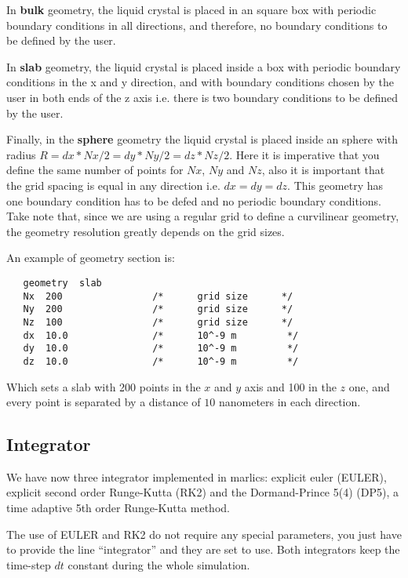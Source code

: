 \documentclass{article}
\begin{document}
In \textbf{bulk} geometry, the liquid crystal is placed in an square box
with periodic boundary conditions in all directions, and therefore, no boundary conditions to be defined by the user.

In \textbf{slab} geometry, the liquid crystal is placed inside a box
with periodic boundary conditions in the x and y direction, and with
boundary conditions chosen by the user in both ends of the z
axis i.e. there is two boundary conditions to be defined by the user. 

Finally, in the \textbf{sphere} geometry the liquid crystal is placed
inside an sphere with radius $R=dx*Nx/2=dy*Ny/2=dz*Nz/2$. Here it
is imperative that you define the same number of points for $Nx$, $Ny$
and $Nz$, also it is important that the grid spacing is equal in any
direction i.e. $dx=dy=dz$. This geometry has one boundary condition
has to be defed and no periodic boundary conditions. Take note that,
since we are using a regular grid to define a curvilinear geometry,
the geometry resolution greatly depends on the grid sizes.

An example of geometry section is:

\begin{lstlisting}	
   geometry  slab
   Nx  200                /*      grid size      */
   Ny  200                /*      grid size      */
   Nz  100                /*      grid size      */
   dx  10.0               /*      10^-9 m         */
   dy  10.0               /*      10^-9 m         */
   dz  10.0               /*      10^-9 m         */
\end{lstlisting}

Which sets a slab with 200 points in the $x$ and $y$ axis and 100 in the $z$ one, and every point is separated by a distance of $10$ nanometers in each direction.

\subsection{Integrator}\label{integrator.param}

We have now  three integrator implemented in marlics: explicit euler (EULER), explicit second order Runge-Kutta (RK2) and the Dormand-Prince 5(4) (DP5), a time adaptive 5th order Runge-Kutta method.

The use of EULER and RK2 do not require any special parameters, you
just have to provide the line ``integrator'' and they are set to
use. Both integrators keep the time-step $dt$ constant during the
whole simulation.
\end{document}
